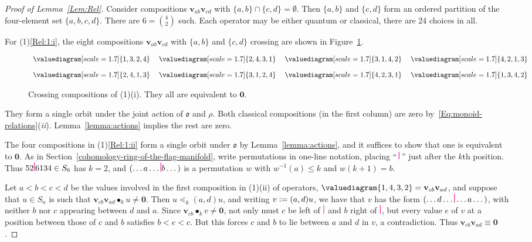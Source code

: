 \documentclass[12pt,oneside,reqno]{amsart}
\theoremstyle{definition}
\numberwithin{equation}{section}
\newcommand{\qv}{{\mathbf v}}
\newcommand{\bzero}{{\mathbf 0}}
\newcommand{\ptsp}{\hspace{0.55pt}}
\newcommand{\pb}{\raisebox{-1pt}{\ptsp\color{magenta}\rule{0.75pt}{11pt}}\ptsp}  %
\newcommand{\p}{\raisebox{-0.5pt}{\ptsp\color{magenta}\rule{0.75pt}{9pt}}\ptsp}  %
\DeclareMathOperator{\kactionop}{{\scriptstyle \bullet}}
\newcommand{\kaction}[1][k]{\kactionop_{#1}}
\newcommand{\ncycle}{\mathfrak o}
\begin{document}
\begin{proof}[Proof of Lemma~\ref{Lem:Rel}]
  Consider compositions $\qv_{ab}\qv_{cd}$ with $\{a,b\}\cap\{c,d\}=\emptyset$.
  Then $\{a,b\}$ and $\{c,d\}$ form an ordered partition of the four-element set $\{a,b,c,d\}$.
  There are $6=\binom{4}{2}$ such.
  Each operator may be either quantum or classical, there are 24 choices in all.
  
  For (1)\ref{Rel:1:i},
  the eight compositions  $\qv_{ab}\qv_{cd}$ with $\{a,b\}$ and $\{c,d\}$ crossing are shown in Figure~\ref{fig:crossing-operators}.
\begin{figure}[htpb]
 \centering
  \begin{equation*}
    \begin{array}{l@{\hskip1.25em}l@{\hskip1.25em}l@{\hskip1.25em}l}
        \valuediagram[scale=1.7]{{1,3},{2,4}} & \valuediagram[scale=1.7]{{2,4},{3,1}}
      & \valuediagram[scale=1.7]{{3,1},{4,2}} & \valuediagram[scale=1.7]{{4,2},{1,3}}
            \\[10pt]
        \valuediagram[scale=1.7]{{2,4},{1,3}} & \valuediagram[scale=1.7]{{3,1},{2,4}}
      & \valuediagram[scale=1.7]{{4,2},{3,1}} & \valuediagram[scale=1.7]{{1,3},{4,2}}
    \end{array}
 \end{equation*}
  \caption{Crossing compositions of (1)(i).
   They all are equivalent to $\bzero$.}
 \label{fig:crossing-operators}
\end{figure}
 They form a single orbit under the joint action of $\ncycle$ and $\rho$.
 Both classical compositions (in the first column) are zero by~\eqref{Eq:monoid-relations}({\it ii}).
 Lemma~\ref{lemma:actions} implies the rest are zero.

 The four compositions in (1)\ref{Rel:1:ii} form a single orbit under $\ncycle$ by Lemma~\ref{lemma:actions}, and it suffices to show that one is equivalent to $\bzero$.
 As in Section~\ref{cohomology-ring-of-the-flag-manifold}, 
 write permutations in one-line notation, placing ``\,$\p$\,'' just after the $k$th position.
 Thus $52\pb 6134\in S_6$ has $k=2$,
 and $(\dotsc a\dotsc \pb b \dotsc)$ is a permutation $w$ with $w^{-1}(a)\leq k$ and $w(k{+}1)=b$.

 Let $a<b<c<d$ be the values involved in the first composition in (1)(ii) of operators,
 $\valuediagram{{1,4},{3,2}}=\qv_{cb}\qv_{ad}$, and suppose that $u\in S_n$ is such that $\qv_{cb} \qv_{ad}\kaction u\neq\bzero$.
 Then $u\lessdot_k (a,d)u$, and writing $v \vcentcolon= (a,d)u$, we have that $v$ has the form  $(\dotsc d\dotsc \pb\dotsc a \dotsc)$,
 with neither $b$ nor $c$ appearing between $d$ and $a$.
 Since $\qv_{cb}\kaction v\neq\bzero$, not only must $c$ be left of $\pb$ and $b$ right of $\pb$, but every value $e$ of $v$
 at a position between those of $c$ and $b$ satisfies $b<e<c$.
 But this forces $c$ and $b$ to lie between $a$ and $d$ in $v$, a contradiction.
 Thus $\qv_{cb} \qv_{ad}\equiv\bzero$.


\end{proof}
\end{document}

